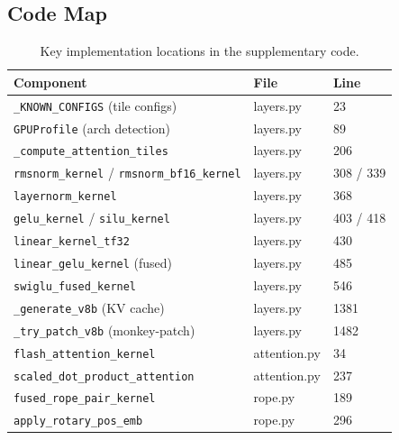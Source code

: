 \documentclass{article}
\begin{document}
\subsection{Code Map}

\begin{table}[h]
\centering
\caption{Key implementation locations in the supplementary code.}
\label{tab:codemap}
\small
\begin{tabular}{@{}lll@{}}
\toprule
\textbf{Component} & \textbf{File} & \textbf{Line} \\
\midrule
\texttt{\_KNOWN\_CONFIGS} (tile configs) & layers.py & 23 \\
\texttt{GPUProfile} (arch detection) & layers.py & 89 \\
\texttt{\_compute\_attention\_tiles} & layers.py & 206 \\
\texttt{rmsnorm\_kernel} / \texttt{rmsnorm\_bf16\_kernel} & layers.py & 308 / 339 \\
\texttt{layernorm\_kernel} & layers.py & 368 \\
\texttt{gelu\_kernel} / \texttt{silu\_kernel} & layers.py & 403 / 418 \\
\texttt{linear\_kernel\_tf32} & layers.py & 430 \\
\texttt{linear\_gelu\_kernel} (fused) & layers.py & 485 \\
\texttt{swiglu\_fused\_kernel} & layers.py & 546 \\
\texttt{\_generate\_v8b} (KV cache) & layers.py & 1381 \\
\texttt{\_try\_patch\_v8b} (monkey-patch) & layers.py & 1482 \\
\texttt{flash\_attention\_kernel} & attention.py & 34 \\
\texttt{scaled\_dot\_product\_attention} & attention.py & 237 \\
\texttt{fused\_rope\_pair\_kernel} & rope.py & 189 \\
\texttt{apply\_rotary\_pos\_emb} & rope.py & 296 \\
\bottomrule
\end{tabular}
\end{table}
\end{document}
